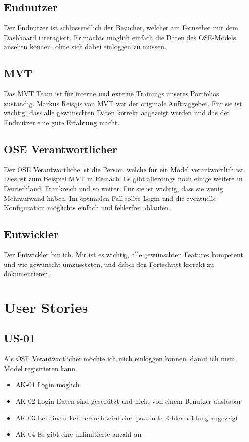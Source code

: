 \subsection{Endnutzer}
Der Endnutzer ist schlussendlich der Besucher, welcher am Fernseher mit dem Dashboard interagiert. Er möchte möglich einfach die Daten des OSE-Models ansehen können, ohne sich dabei einloggen zu müssen.
\subsection{MVT}
Das MVT Team ist für interne und externe Trainings unseres Portfolios zuständig. Markus Reisgis von MVT war der originale Auftraggeber. Für sie ist wichtig, dass alle gewünschten Daten korrekt angezeigt werden und das der Endnutzer eine gute Erfahrung macht.
\subsection{OSE Verantwortlicher}
Der OSE Verantwortliche ist die Person, welche für ein Model verantwortlich ist. Dies ist zum Beispiel MVT in Reinach. Es gibt allerdings noch einige weitere in Deutschland, Frankreich und so weiter. Für sie ist wichtig, dass sie wenig Mehraufwand haben. Im optimalen Fall sollte Login und die eventuelle Konfiguration möglichts einfach und fehlerfrei ablaufen.
\subsection{Entwickler}
Der Entwickler bin ich. Mir ist es wichtig, alle gewünschten Features kompetent und wie gewünscht umzusetzten, und dabei den Fortschritt korrekt zu dokumentieren.
\section{User Stories}
\subsection{US-01}
Als OSE Verantwortlicher möchte ich mich einloggen können, damit ich mein Model registrieren kann.
\begin{itemize}
  \item AK-01 Login möglich
  \item AK-02 Login Daten sind geschützt und nicht von einem Benutzer auslesbar
  \item AK-03 Bei einem Fehlversuch wird eine passende Fehlermeldung angezeigt
  \item AK-04 Es gibt eine unlimitierte anzahl an 
\end{itemize}
